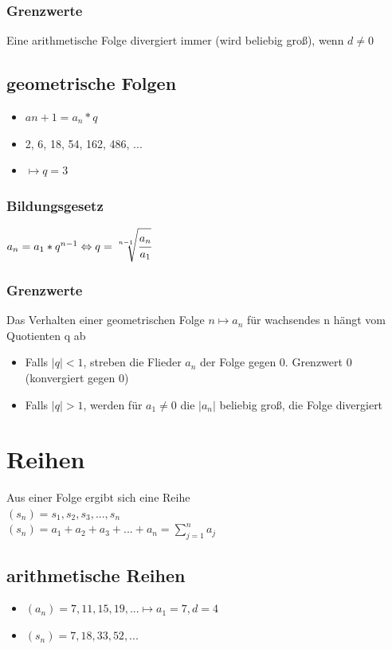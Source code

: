 \documentclass[a4paper,12pt]{scrartcl}
\begin{document}
\subsubsection{Grenzwerte}
Eine arithmetische Folge divergiert immer (wird beliebig groß), wenn $d \ne 0$

\subsection{geometrische Folgen}
\begin{itemize}
\item $a{n+1} = a_n * q$
\item 2, 6, 18, 54, 162, 486, ...
\item $\mapsto q = 3$
\end{itemize}

\subsubsection{Bildungsgesetz}
$a_n = a_1 * q^{n - 1} \Leftrightarrow q = \sqrt[n-1]{\cfrac{a_n}{a_1}}$

\subsubsection{Grenzwerte}
Das Verhalten einer geometrischen Folge $n \mapsto a_n$ für wachsendes n hängt vom Quotienten q ab
\begin{itemize}
\item Falls $|q| < 1$, streben die Flieder $a_n$ der Folge gegen 0. Grenzwert 0 (konvergiert gegen 0)
\item Falls $|q| > 1$, werden für $a_1 \ne 0$ die $|a_n|$ beliebig groß, die Folge divergiert
\end{itemize}

\newpage
\section{Reihen}
Aus einer Folge ergibt sich eine Reihe \\
$(s_n) = s_1, s_2, s_3, ..., s_n$ \\
$(s_n) = a_1 + a_2 + a_3 + ... + a_n = \sum\limits_{j=1}^n a_j$

\subsection{arithmetische Reihen}
\begin{itemize}
\item $(a_n) = 7, 11, 15, 19, ... \mapsto a_1 = 7, d = 4$ 
\item $(s_n) = 7, 18, 33, 52, ...$
\end{itemize}
\end{document}
